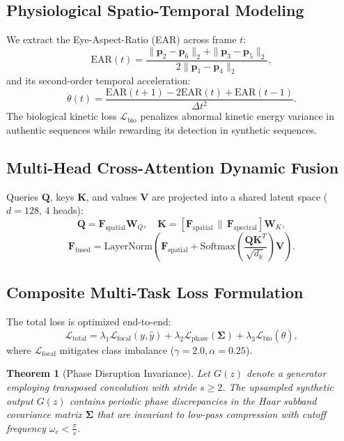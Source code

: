 \documentclass[journal]{IEEEtran}
\newtheorem{theorem}{Theorem}
\begin{document}
\subsection{Physiological Spatio-Temporal Modeling}
We extract the Eye-Aspect-Ratio (EAR) across frame $t$:
\begin{equation}
\text{EAR}(t) = \frac{\|\mathbf{p}_2 - \mathbf{p}_6\|_2 + \|\mathbf{p}_3 - \mathbf{p}_5\|_2}{2 \|\mathbf{p}_1 - \mathbf{p}_4\|_2},
\end{equation}
and its second-order temporal acceleration:
\begin{equation}
\ddot{\theta}(t) = \frac{\text{EAR}(t+1) - 2\text{EAR}(t) + \text{EAR}(t-1)}{\Delta t^2}.
\end{equation}
The biological kinetic loss $\mathcal{L}_{\text{bio}}$ penalizes abnormal kinetic energy variance in authentic sequences while rewarding its detection in synthetic sequences.

\subsection{Multi-Head Cross-Attention Dynamic Fusion}
Queries $\mathbf{Q}$, keys $\mathbf{K}$, and values $\mathbf{V}$ are projected into a shared latent space ($d=128$, 4 heads):
\begin{equation}
\mathbf{Q} = \mathbf{F}_{\text{spatial}} \mathbf{W}_Q, \quad \mathbf{K} = [\mathbf{F}_{\text{spatial}} \,\|\, \mathbf{F}_{\text{spectral}}] \mathbf{W}_K,
\end{equation}
\begin{equation}
\mathbf{F}_{\text{fused}} = \text{LayerNorm}\left( \mathbf{F}_{\text{spatial}} + \text{Softmax}\left( \frac{\mathbf{Q} \mathbf{K}^T}{\sqrt{d_k}} \right) \mathbf{V} \right).
\end{equation}

\subsection{Composite Multi-Task Loss Formulation}
The total loss is optimized end-to-end:
\begin{equation}
\mathcal{L}_{\text{total}} = \lambda_1 \mathcal{L}_{\text{focal}}(y, \hat{y}) + \lambda_2 \mathcal{L}_{\text{phase}}(\mathbf{\Sigma}) + \lambda_3 \mathcal{L}_{\text{bio}}(\ddot{\theta}),
\end{equation}
where $\mathcal{L}_{\text{focal}}$ mitigates class imbalance ($\gamma=2.0, \alpha=0.25$).

\begin{theorem}[Phase Disruption Invariance]
Let $G(z)$ denote a generator employing transposed convolution with stride $s \ge 2$. The upsampled synthetic output $G(z)$ contains periodic phase discrepancies in the Haar subband covariance matrix $\mathbf{\Sigma}$ that are invariant to low-pass compression with cutoff frequency $\omega_c < \frac{\pi}{s}$.
\end{theorem}
\end{document}
